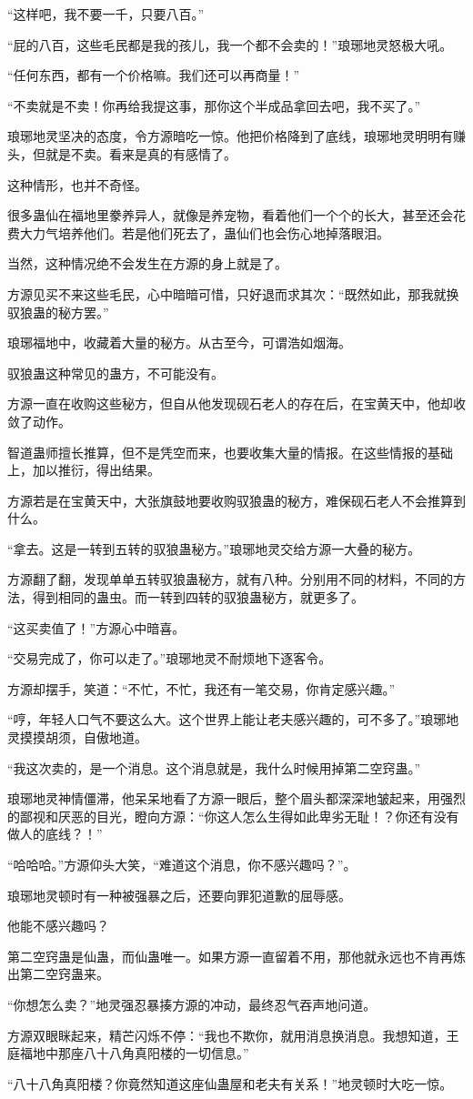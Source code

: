 \begin{this_body}
“这样吧，我不要一千，只要八百。”

“屁的八百，这些毛民都是我的孩儿，我一个都不会卖的！”琅琊地灵怒极大吼。

“任何东西，都有一个价格嘛。我们还可以再商量！”

“不卖就是不卖！你再给我提这事，那你这个半成品拿回去吧，我不买了。”

琅琊地灵坚决的态度，令方源暗吃一惊。他把价格降到了底线，琅琊地灵明明有赚头，但就是不卖。看来是真的有感情了。

这种情形，也并不奇怪。

很多蛊仙在福地里豢养异人，就像是养宠物，看着他们一个个的长大，甚至还会花费大力气培养他们。若是他们死去了，蛊仙们也会伤心地掉落眼泪。

当然，这种情况绝不会发生在方源的身上就是了。

方源见买不来这些毛民，心中暗暗可惜，只好退而求其次：“既然如此，那我就换驭狼蛊的秘方罢。”

琅琊福地中，收藏着大量的秘方。从古至今，可谓浩如烟海。

驭狼蛊这种常见的蛊方，不可能没有。

方源一直在收购这些秘方，但自从他发现砚石老人的存在后，在宝黄天中，他却收敛了动作。

智道蛊师擅长推算，但不是凭空而来，也要收集大量的情报。在这些情报的基础上，加以推衍，得出结果。

方源若是在宝黄天中，大张旗鼓地要收购驭狼蛊的秘方，难保砚石老人不会推算到什么。

“拿去。这是一转到五转的驭狼蛊秘方。”琅琊地灵交给方源一大叠的秘方。

方源翻了翻，发现单单五转驭狼蛊秘方，就有八种。分别用不同的材料，不同的方法，得到相同的蛊虫。而一转到四转的驭狼蛊秘方，就更多了。

“这买卖值了！”方源心中暗喜。

“交易完成了，你可以走了。”琅琊地灵不耐烦地下逐客令。

方源却摆手，笑道：“不忙，不忙，我还有一笔交易，你肯定感兴趣。”

“哼，年轻人口气不要这么大。这个世界上能让老夫感兴趣的，可不多了。”琅琊地灵摸摸胡须，自傲地道。

“我这次卖的，是一个消息。这个消息就是，我什么时候用掉第二空窍蛊。”

琅琊地灵神情僵滞，他呆呆地看了方源一眼后，整个眉头都深深地皱起来，用强烈的鄙视和厌恶的目光，瞪向方源：“你这人怎么生得如此卑劣无耻！？你还有没有做人的底线？！”

“哈哈哈。”方源仰头大笑，“难道这个消息，你不感兴趣吗？”。

琅琊地灵顿时有一种被强暴之后，还要向罪犯道歉的屈辱感。

他能不感兴趣吗？

第二空窍蛊是仙蛊，而仙蛊唯一。如果方源一直留着不用，那他就永远也不肯再炼出第二空窍蛊来。

“你想怎么卖？”地灵强忍暴揍方源的冲动，最终忍气吞声地问道。

方源双眼眯起来，精芒闪烁不停：“我也不欺你，就用消息换消息。我想知道，王庭福地中那座八十八角真阳楼的一切信息。”

“八十八角真阳楼？你竟然知道这座仙蛊屋和老夫有关系！”地灵顿时大吃一惊。

\end{this_body}

